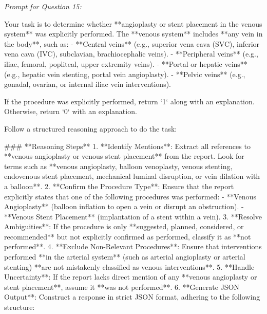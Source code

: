 \textit{\normalsize Prompt for Question  15:}
\begin{mdframed}[]
\normalsize

Your task is to determine whether **angioplasty or stent placement in the venous system** was explicitly performed. The **venous system** includes **any vein in the body**, such as:  
- **Central veins** (e.g., superior vena cava (SVC), inferior vena cava (IVC), subclavian, brachiocephalic veins).  
- **Peripheral veins** (e.g., iliac, femoral, popliteal, upper extremity veins).  
- **Portal or hepatic veins** (e.g., hepatic vein stenting, portal vein angioplasty).  
- **Pelvic veins** (e.g., gonadal, ovarian, or internal iliac vein interventions).  

If the procedure was explicitly performed, return `1` along with an explanation. Otherwise, return `0` with an explanation.

Follow a structured reasoning approach to do the task:

### **Reasoning Steps**  
1. **Identify Mentions**: Extract all references to **venous angioplasty or venous stent placement** from the report. Look for terms such as **venous angioplasty, balloon venoplasty, venous stenting, endovenous stent placement, mechanical luminal disruption, or vein dilation with a balloon**.  
2. **Confirm the Procedure Type**: Ensure that the report explicitly states that one of the following procedures was performed:  
   - **Venous Angioplasty** (balloon inflation to open a vein or disrupt an obstruction).  
   - **Venous Stent Placement** (implantation of a stent within a vein).  
3. **Resolve Ambiguities**: If the procedure is only **suggested, planned, considered, or recommended** but not explicitly confirmed as performed, classify it as **not performed**.  
4. **Exclude Non-Relevant Procedures**: Ensure that interventions performed **in the arterial system** (such as arterial angioplasty or arterial stenting) **are not mistakenly classified as venous interventions**.  
5. **Handle Uncertainty**: If the report lacks direct mention of any **venous angioplasty or stent placement**, assume it **was not performed**.  
6. **Generate JSON Output**: Construct a response in strict JSON format, adhering to the following structure:  

\end{mdframed}


